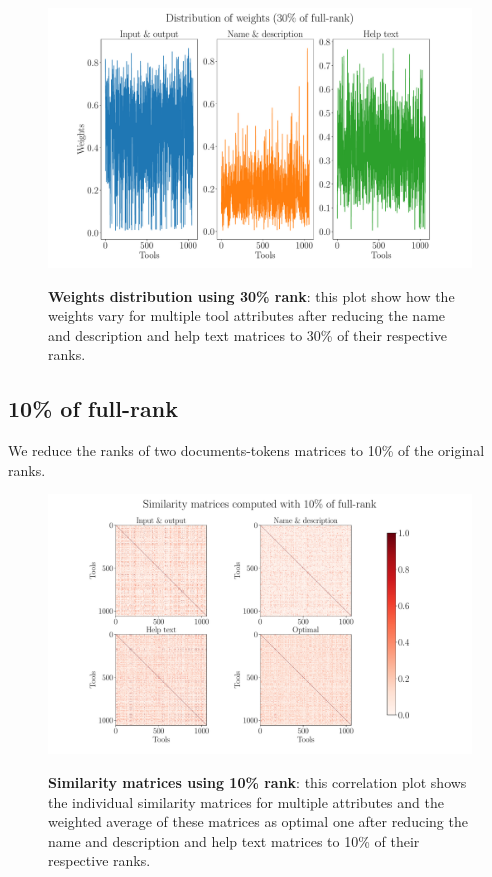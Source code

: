 \begin{figure}[h]
\begin{centering}
    {\includegraphics[scale=0.35]{figures/Weights_030.pdf}}
    \caption[Weights distribution 30\% rank]{\textbf{Weights distribution using 30\% rank}: this plot show how the weights vary for multiple tool attributes after reducing the name and description and help text matrices to 30\% of their respective ranks.}
\end{centering}
\end{figure}

\subsection{10\% of full-rank}
We reduce the ranks of two documents-tokens matrices to 10\% of the original ranks.

\begin{figure}[h]
\begin{centering}
    {\includegraphics[scale=0.35]{figures/Similarity_matrices_010.pdf}}
    \caption[Similarity matrices 10\% rank]{\textbf{Similarity matrices using 10\% rank}: this correlation plot shows the individual similarity matrices for multiple attributes and the weighted average of these matrices as optimal one after reducing the name and description and help text matrices to 10\% of their respective ranks.}
\end{centering}
\end{figure}

